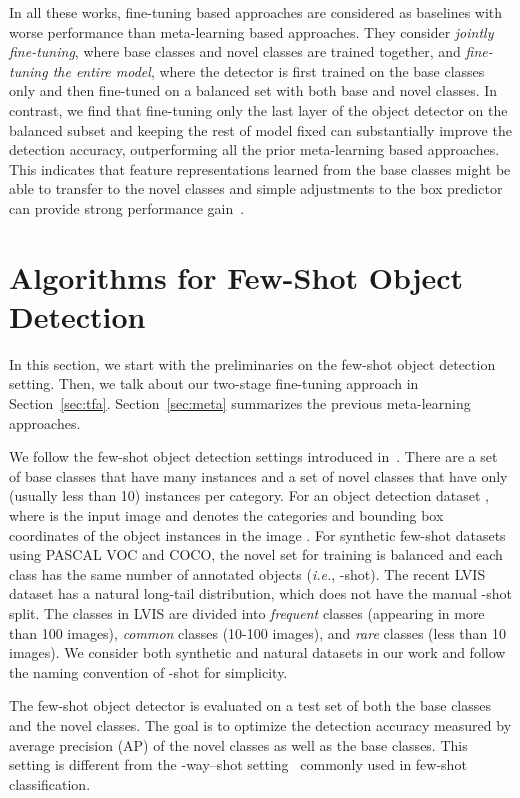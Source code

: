 \documentclass{article}
\begin{document}
In all these works, fine-tuning based approaches are considered as baselines
with worse performance than meta-learning based approaches. They consider
\emph{jointly fine-tuning}, where base classes and novel classes are trained together, and \emph{fine-tuning the entire model}, where the detector is first trained on the base classes only and then fine-tuned on a balanced set with both base and novel classes. In contrast, we find that fine-tuning only the last layer of the object detector on the balanced subset and keeping the rest of model fixed can substantially improve the
detection accuracy, outperforming all the prior meta-learning based
approaches. This indicates that feature representations
learned from the base classes might be able to transfer to the novel classes
and simple adjustments to the box predictor can provide 
strong performance gain~\cite{dhillon2019baseline}. 


 \vspace{-0.3cm}
\section{Algorithms for Few-Shot Object Detection}

In this section, we start with the preliminaries on the few-shot object detection setting. Then, we talk about our two-stage fine-tuning approach in
Section~\ref{sec:tfa}. Section~\ref{sec:meta} summarizes the previous meta-learning approaches.

We follow the few-shot object detection settings introduced in~\citet{kang2019few}. There are a set of base
classes  that have many instances and a set of novel classes  that
have only  (usually less than 10) instances per category.
For an object detection dataset , where 
is the input image and  denotes the categories 
and bounding box coordinates  of the  object instances in the image .
For synthetic few-shot datasets using
PASCAL VOC and COCO, the novel set for training is balanced and each class has the same number of 
annotated objects (\textit{i.e.}, -shot). The recent LVIS dataset has a natural long-tail distribution, which does
not have the manual -shot split. The classes in LVIS are divided into \emph{frequent} classes
(appearing in more than 100 images), \emph{common} classes (10-100 images), and \emph{rare}
classes (less than 10 images). We consider both synthetic and natural datasets in our work and
follow the naming convention of -shot for simplicity. 

The few-shot object detector is evaluated on a test set of both the base classes and
the novel classes. The goal is to optimize the detection accuracy measured by average precision (AP)
of the novel classes as well as the base classes. This setting is different from the -way--shot setting~\cite{finn2017model,vinyals2016matching,snell2017prototypical}
commonly used in few-shot classification. 
\end{document}
